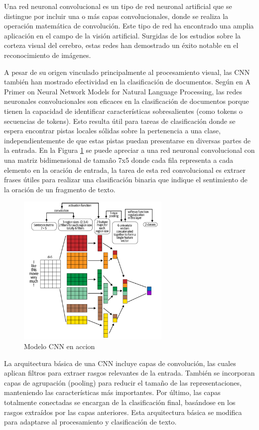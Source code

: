 Una red neuronal convolucional es un tipo de red neuronal artificial que se distingue por incluir una o más capas convolucionales, donde se realiza la operación matemática de convolución. Este tipo de red ha encontrado una amplia aplicación en el campo de la visión artificial. Surgidas de los estudios sobre la corteza visual del cerebro, estas redes han demostrado un éxito notable en el reconocimiento de imágenes.


A pesar de su origen vinculado principalmente al procesamiento visual, las CNN también han mostrado efectividad en la clasificación de documentos. Según \cite{goldberg2016primer} en A Primer on Neural Network Models for Natural Language Processing, las redes neuronales convolucionales son eficaces en la clasificación de documentos porque tienen la capacidad de identificar características sobresalientes (como tokens o secuencias de tokens). Esto resulta útil para tareas de clasificación donde se espera encontrar pistas locales sólidas sobre la pertenencia a una clase, independientemente de que estas pistas puedan presentarse en diversas partes de la entrada. En la Figura \ref{fig:an9} se puede apreciar a una red neuronal convolucional con una matriz bidimensional de tamaño 7x5 donde cada fila representa a cada elemento en la oración de entrada, la tarea de esta red convolucional es extraer frases útiles para realizar una clasificación binaria que indique el sentimiento de la oración de un fragmento de texto.
\begin{figure}
	\includegraphics[width=0.65\textwidth]{capitulo2/figuras/an9.png}
	\caption{Modelo CNN en accion}
	\label{fig:an9}
\end{figure}

La arquitectura básica de una CNN incluye capas de convolución, las cuales aplican filtros para extraer rasgos relevantes de la entrada. También se incorporan capas de agrupación (pooling) para reducir el tamaño de las representaciones, manteniendo las características más importantes. Por último, las capas totalmente conectadas se encargan de la clasificación final, basándose en los rasgos extraídos por las capas anteriores. Esta arquitectura básica se modifica para adaptarse al procesamiento y clasificación de texto.

